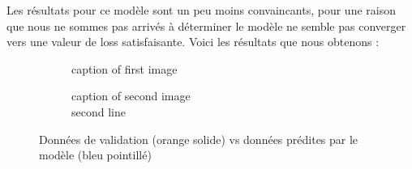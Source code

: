 \documentclass{article}
\begin{document}
    Les résultats pour ce modèle sont un peu moins convaincants, pour une raison que nous ne sommes pas arrivés à déterminer le modèle ne semble pas converger vers une valeur de loss satisfaisante.
    Voici les résultats que nous obtenons :\\
    \begin{figure}[H]
        \centering
        \begin{subfigure}[t]{0.49\textwidth}
            \caption{caption of first image}
        \end{subfigure}
        \hfill
        \begin{subfigure}[t]{0.49\textwidth}
        \caption{caption of second image\\second line}
    \end{subfigure}
        \caption{Données de validation (orange solide) vs données prédites par le modèle (bleu pointillé)}
        \label{fig:test}
    \end{figure}
\end{document}

